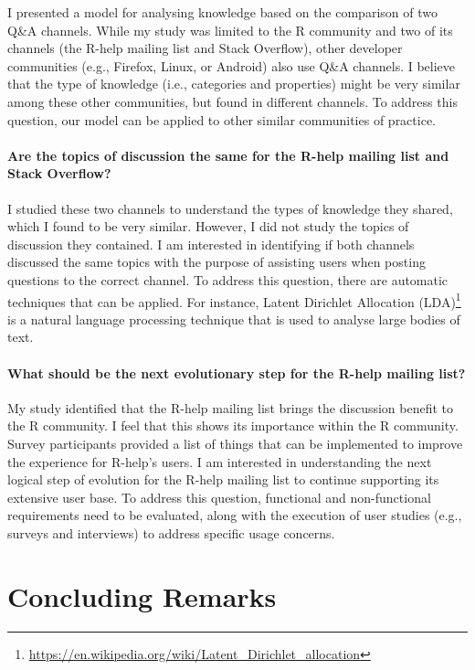 \documentclass{sig-alternate-05-2015}
\begin{document}
	I presented a model for analysing knowledge based on the comparison of two Q\&A channels. 
	While my study was limited to the R community and two of its channels (the R-help mailing list and Stack Overflow), 
	other developer communities (e.g., Firefox, Linux, or Android) also use Q\&A channels.
	I believe that the type of knowledge (i.e., categories and properties) might be very similar among these other communities, but found in different channels.
	To address this question, our model can be applied to other similar communities of practice.

	\paragraph{Are the topics of discussion the same for the R-help mailing list and Stack Overflow?}

	I studied these two channels to understand the types of knowledge they shared, which I found to be very similar. 
	However, I did not study the topics of discussion they contained.
	I am interested in identifying if both channels discussed the same topics with the purpose of assisting users when posting questions to the correct channel. 
	To address this question, there are automatic techniques that can be applied. For instance, Latent Dirichlet Allocation (LDA)\footnote{\url{https://en.wikipedia.org/wiki/Latent_Dirichlet_allocation}} is a natural language processing technique that is used to analyse large bodies of text.

	\paragraph{What should be the next evolutionary step for the R-help mailing list?}

	My study identified that the R-help mailing list brings the discussion benefit to the R community. 
	I feel that this shows its importance within the R community.
	Survey participants provided a list of things that can be implemented to improve the experience for R-help's users.
	I am interested in understanding the next logical step of evolution for the R-help mailing list to continue supporting its extensive user base.
	To address this question, functional and non-functional requirements need to be evaluated, along with the execution of user studies (e.g., surveys and interviews) to address specific usage concerns.


\section{Concluding Remarks}
\label{cha:conclusion}
\end{document}
